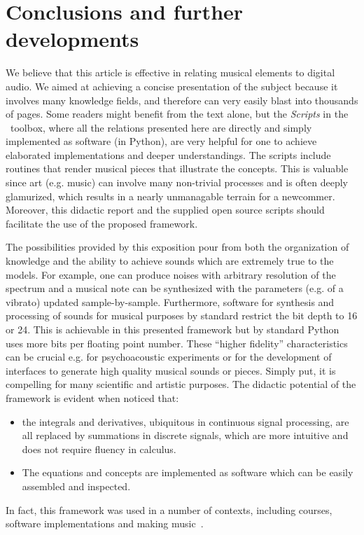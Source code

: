 \section{Conclusions and further developments}
\label{cap:conclusao}
We believe that this article is effective in relating musical elements to digital audio.
We aimed at achieving a concise presentation of the subject because it involves many knowledge fields, and therefore can very easily blast into thousands of pages.
Some readers might benefit from the text alone, but the \emph{Scripts} in the \massa\ toolbox, where all the relations presented here are directly and simply implemented as software (in Python), are very helpful for one to achieve elaborated implementations and deeper understandings.
The scripts include routines that render musical pieces that illustrate the concepts.
This is valuable since art (e.g. music) can involve many non-trivial processes and is often deeply glamurized, which results in a nearly unmanagable terrain for a newcommer.
Moreover, this didactic report and the supplied open source scripts should facilitate the use of the proposed framework.

The possibilities provided by this exposition pour from both the organization of knowledge and the ability to achieve sounds which are extremely true to the models.
For example, one can produce noises with arbitrary resolution of the spectrum and a musical note can be synthesized with the parameters (e.g. of a vibrato) updated sample-by-sample.
Furthermore, software for synthesis and processing of sounds for musical purposes
by standard restrict the bit depth to 16 or 24.
This is achievable in this presented framework but by standard Python uses more bits per floating point number.
These ``higher fidelity'' characteristics can be crucial
e.g. for psychoacoustic experiments or for the development of
interfaces to generate high quality musical sounds or pieces.
Simply put, it is compelling
for many scientific and artistic purposes.
The didactic potential of the framework is evident when noticed that:
\begin{itemize}
	\item the integrals and derivatives, ubiquitous in continuous signal processing,
are all replaced by summations in discrete signals,
which are more intuitive and does not require fluency in calculus.
	\item The equations and concepts are implemented as software which can be easily assembled and inspected.
\end{itemize}
\noindent In fact, this framework was used in a number of contexts, including courses, software implementations and making music~\cite{vimeoLM,vivace,repoDissertacao,dissertacao}.

